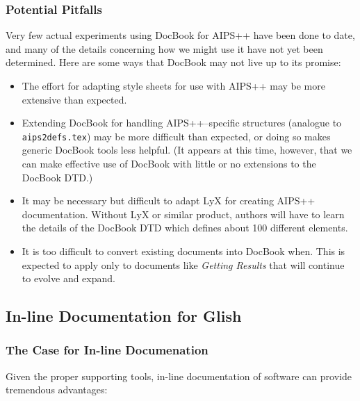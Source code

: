 \subsubsection{Potential Pitfalls}

Very few actual experiments using DocBook for AIPS++ have been done to
date, and many of the details concerning how we might use it have not
yet been determined.  Here are some ways that DocBook may not live up
to its promise: 

\begin{itemize}
\item The effort for adapting style sheets for use with AIPS++ may be
more extensive than expected.

\item Extending DocBook for handling AIPS++--specific structures
(analogue to {\tt aips2defs.tex}) may be more difficult than
expected, or doing so makes generic DocBook tools less helpful.  (It
appears at this time, however, that we can make effective use of
DocBook with little or no extensions to the DocBook DTD.)  

\item It may be necessary but difficult to adapt LyX for creating
AIPS++ documentation.  Without LyX or similar product, authors will
have to learn the details of the DocBook DTD which defines about 100
different elements.

\item It is too difficult to convert existing documents into DocBook
when.  This is expected to apply only to documents like {\it Getting
Results} that will continue to evolve and expand.  

\end{itemize}

\subsection{In-line Documentation for Glish}

\subsubsection{The Case for In-line Documenation}

Given the proper supporting tools, in-line documentation of software
can provide tremendous advantages:


